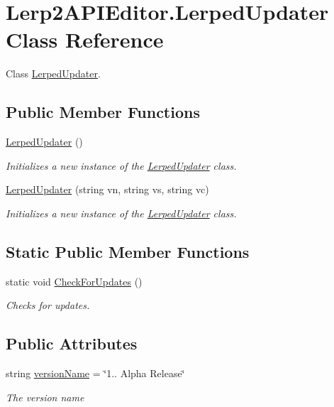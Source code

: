 \hypertarget{class_lerp2_a_p_i_editor_1_1_lerped_updater}{}\section{Lerp2\+A\+P\+I\+Editor.\+Lerped\+Updater Class Reference}
\label{class_lerp2_a_p_i_editor_1_1_lerped_updater}


Class \hyperlink{class_lerp2_a_p_i_editor_1_1_lerped_updater}{Lerped\+Updater}.  


\subsection*{Public Member Functions}
\begin{DoxyCompactItemize}
\item 
\hyperlink{class_lerp2_a_p_i_editor_1_1_lerped_updater_a8d527466ef6e3184716ad0e9275f5a5a}{Lerped\+Updater} ()
\begin{DoxyCompactList}\small\item\em Initializes a new instance of the \hyperlink{class_lerp2_a_p_i_editor_1_1_lerped_updater}{Lerped\+Updater} class. \end{DoxyCompactList}\item 
\hyperlink{class_lerp2_a_p_i_editor_1_1_lerped_updater_a7b76ab00342f20c44ce74977f713a60f}{Lerped\+Updater} (string vn, string vs, string vc)
\begin{DoxyCompactList}\small\item\em Initializes a new instance of the \hyperlink{class_lerp2_a_p_i_editor_1_1_lerped_updater}{Lerped\+Updater} class. \end{DoxyCompactList}\end{DoxyCompactItemize}
\subsection*{Static Public Member Functions}
\begin{DoxyCompactItemize}
\item 
static void \hyperlink{class_lerp2_a_p_i_editor_1_1_lerped_updater_ae973640f5a7a8da997f8e98c3ad8994d}{Check\+For\+Updates} ()
\begin{DoxyCompactList}\small\item\em Checks for updates. \end{DoxyCompactList}\end{DoxyCompactItemize}
\subsection*{Public Attributes}
\begin{DoxyCompactItemize}
\item 
string \hyperlink{class_lerp2_a_p_i_editor_1_1_lerped_updater_ac8af4e9eef48f6d67090e5a8c015e383}{version\+Name} = \char`\"{}1.. Alpha Release\char`\"{}
\begin{DoxyCompactList}\small\item\em The version name \end{DoxyCompactList}\end{DoxyCompactItemize}
